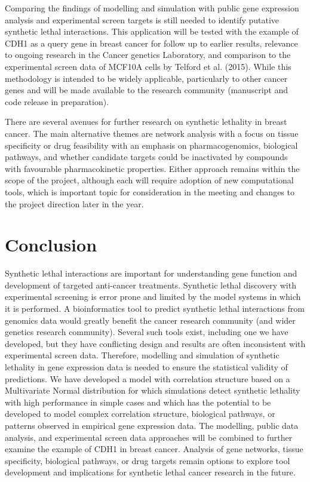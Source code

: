 Comparing the findings of modelling and simulation with public gene expression analysis and experimental screen targets is still needed to identify putative synthetic lethal interactions.  This application will be tested with the example of CDH1 as a query gene in breast cancer for follow up to earlier results, relevance to ongoing research in the Cancer genetics Laboratory, and comparison to the experimental screen data of MCF10A cells by Telford et al. (2015).  While this methodology is intended to be widely applicable, particularly to other cancer genes and will be made available to the research community (manuscript and code release in preparation).

There are several avenues for further research on synthetic lethality in breast cancer. The main alternative themes are network analysis with a focus on tissue specificity or drug feasibility with an emphasis on pharmacogenomics, biological pathways, and whether candidate targets could be inactivated by compounds with favourable pharmacokinetic properties. Either approach remains within the scope of the project, although each will require adoption of new computational tools, which is important topic for consideration in the meeting and changes to the project direction later in the year.

\section{Conclusion}

Synthetic lethal interactions are important for understanding gene function and development of targeted anti-cancer treatments.  Synthetic lethal discovery with experimental screening is error prone and limited by the model systems in which it is performed.  A bioinformatics tool to predict synthetic lethal interactions from genomics data would greatly benefit the cancer research community (and wider genetics research community).  Several such tools exist, including one we have developed, but they have conflicting design and results are often inconsistent with experimental screen data. Therefore, modelling and simulation of synthetic lethality in gene expression data is needed to ensure the statistical validity of predictions.  We have developed a model with correlation structure based on a Multivariate Normal distribution for which simulations detect synthetic lethality with high performance in simple cases and which has the potential to be developed to model complex correlation structure, biological pathways, or patterns observed in empirical gene expression data.  The modelling, public data analysis, and experimental screen data approaches will be combined to further examine the example of CDH1 in breast cancer.  Analysis of gene networks, tissue specificity, biological pathways, or drug targets remain options to explore tool development and implications for synthetic lethal cancer research in the future. 


